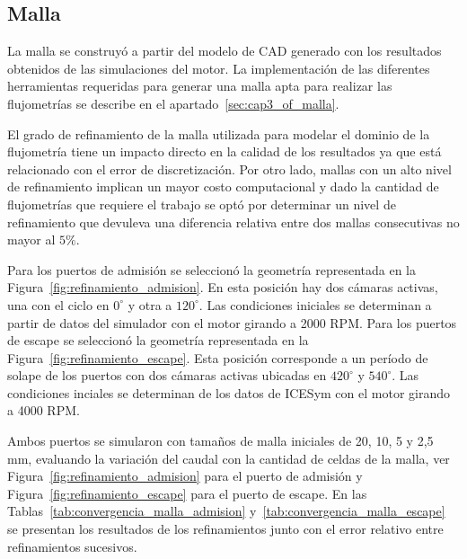 

\subsection{Malla}

La malla se construyó a partir del modelo de CAD generado con los resultados
obtenidos de las simulaciones del motor.
%
La implementación de las diferentes herramientas requeridas para generar una
malla apta para realizar las flujometrías se describe en el
apartado~\ref{sec:cap3_of_malla}.

El grado de refinamiento de la malla utilizada para modelar el dominio de la
flujometría tiene un impacto directo en la calidad de los resultados ya que
está relacionado con el error de discretización.
%
Por otro lado, mallas con un alto nivel de refinamiento implican un mayor costo
computacional y dado la cantidad de flujometrías que requiere el trabajo se
optó por determinar un nivel de refinamiento que devuleva una diferencia
relativa entre dos mallas consecutivas no mayor al $5\%$.

Para los puertos de admisión se seleccionó la geometría representada en la
Figura~\ref{fig:refinamiento_admision}.
%
En esta posición hay dos cámaras activas, una con el ciclo en $0^{\circ}$ y
otra a $120^{\circ}$.
%
Las condiciones iniciales se determinan a partir de datos del simulador con el
motor girando a 2000 RPM.%
%
Para los puertos de escape se seleccionó la geometría representada en la
Figura~\ref{fig:refinamiento_escape}.
%
Esta posición corresponde a un período de solape de los puertos con dos cámaras
activas ubicadas en $420^{\circ}$ y $540^{\circ}$.
%
Las condiciones inciales se determinan de los datos de ICESym con el motor
girando a 4000 RPM.

Ambos puertos se simularon con tamaños de malla iniciales de 20, 10, 5 y 2,5 mm,
evaluando la variación del caudal con la cantidad de celdas de la malla, ver
Figura~\ref{fig:refinamiento_admision} para el puerto de admisión y
Figura~\ref{fig:refinamiento_escape} para el puerto de escape.
%
En las Tablas~\ref{tab:convergencia_malla_admision}
y~\ref{tab:convergencia_malla_escape} se presentan los resultados de los
refinamientos junto con el error relativo entre refinamientos sucesivos.

